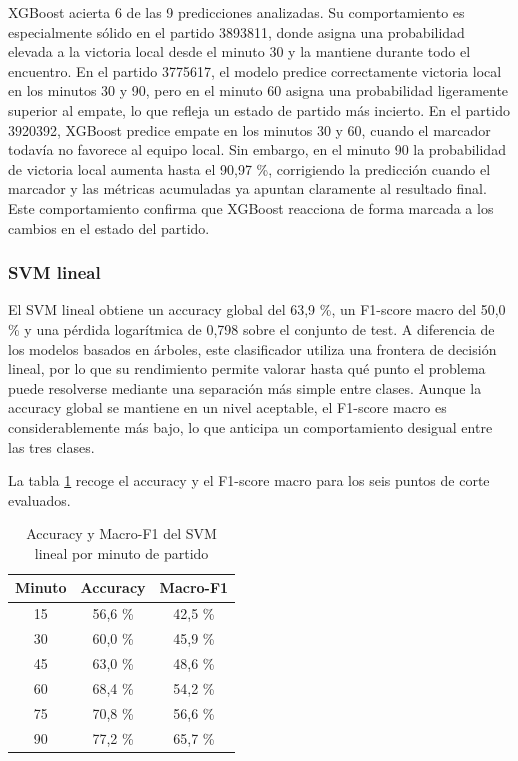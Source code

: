 XGBoost acierta 6 de las 9 predicciones analizadas. Su comportamiento es especialmente sólido en el partido 3893811, donde asigna una probabilidad elevada a la victoria local desde el minuto 30 y la mantiene durante todo el encuentro. En el partido 3775617, el modelo predice correctamente victoria local en los minutos 30 y 90, pero en el minuto 60 asigna una probabilidad ligeramente superior al empate, lo que refleja un estado de partido más incierto. En el partido 3920392, XGBoost predice empate en los minutos 30 y 60, cuando el marcador todavía no favorece al equipo local. Sin embargo, en el minuto 90 la probabilidad de victoria local aumenta hasta el 90,97 \%, corrigiendo la predicción cuando el marcador y las métricas acumuladas ya apuntan claramente al resultado final. Este comportamiento confirma que XGBoost reacciona de forma marcada a los cambios en el estado del partido.

\subsubsection{SVM lineal}

El SVM lineal obtiene un accuracy global del 63,9 \%, un F1-score macro del 50,0 \% y una pérdida logarítmica de 0,798 sobre el conjunto de test. A diferencia de los modelos basados en árboles, este clasificador utiliza una frontera de decisión lineal, por lo que su rendimiento permite valorar hasta qué punto el problema puede resolverse mediante una separación más simple entre clases. Aunque la accuracy global se mantiene en un nivel aceptable, el F1-score macro es considerablemente más bajo, lo que anticipa un comportamiento desigual entre las tres clases.

La tabla \ref{tab:svm_por_minuto} recoge el accuracy y el F1-score macro para los seis puntos de corte evaluados.

\begin{table}[H]
    \centering
    \begin{tabular}{ccc}
        \hline
        \textbf{Minuto} & \textbf{Accuracy} & \textbf{Macro-F1} \\
        \hline
        15              & 56,6 \%           & 42,5 \%           \\
        30              & 60,0 \%           & 45,9 \%           \\
        45              & 63,0 \%           & 48,6 \%           \\
        60              & 68,4 \%           & 54,2 \%           \\
        75              & 70,8 \%           & 56,6 \%           \\
        90              & 77,2 \%           & 65,7 \%           \\
        \hline
    \end{tabular}
    \caption{Accuracy y Macro-F1 del SVM lineal por minuto de partido}
    \label{tab:svm_por_minuto}
\end{table}

